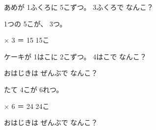 
\begin{reidai}[1つ\R{分}{ぶん}と いくつ\R{分}{ぶん}]
あめが 1ふくろに 5こずつ。 3ふくろで なんこ？

\noindent\begin{minipage}[c]{0.7\linewidth}
\kangaekata 1つの 5こが、 3つ。

 × 3 ＝ 15 \kotaenext 15こ
\end{minipage}\hfill
\begin{minipage}[c]{0.28\linewidth}\centering
{}
\end{minipage}
\end{reidai}

\begin{jibun}
ケーキが 1はこに 2こずつ。 4はこで なんこ？
\bkshikiran
{}
\end{jibun}

\begin{reidai}
\noindent\begin{minipage}[c]{0.7\linewidth}
おはじきは ぜんぶで なんこ？

\kangaekata たて 4こが 6れつ。

 × 6 ＝ 24 \kotaenext 24こ
\end{minipage}\hfill
\begin{minipage}[c]{0.28\linewidth}\centering
{}
\end{minipage}
\end{reidai}

\begin{jibun}
\noindent\begin{minipage}[c]{0.66\linewidth}
おはじきは ぜんぶで なんこ？
\end{minipage}\hfill
\begin{minipage}[c]{0.32\linewidth}\centering
{}
\end{minipage}
\bkshikiran
{}
\end{jibun}

